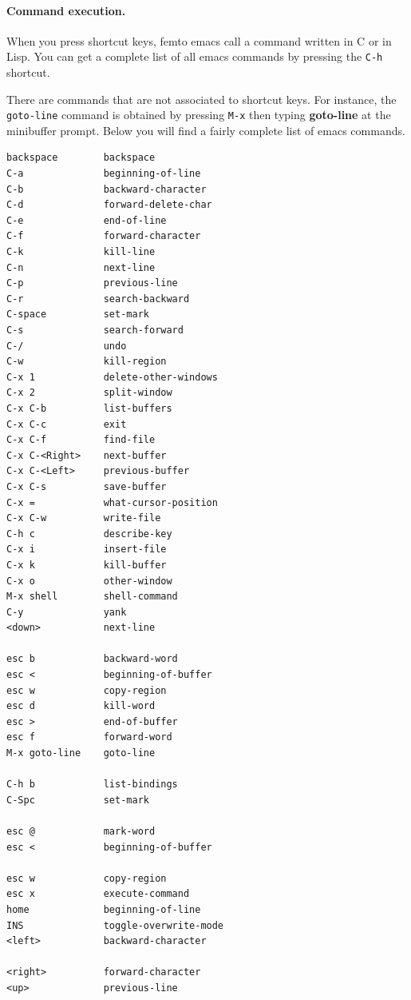 \documentclass[a4paper,12pt]{book}
\begin{document}
\paragraph{Command execution.} When you press 
shortcut keys, femto emacs call a command written in
C or in Lisp. You can get a complete list of all
emacs commands by pressing the 
\verb|C-h| shortcut.

There are commands that are not associated to
 shortcut keys. 
For instance, the \verb|goto-line| command
is obtained by pressing \verb|M-x| then typing
{\bf goto-line} at the minibuffer prompt.
Below you will find a fairly complete list
of emacs commands.

\begin{verbatim}
backspace        backspace
C-a              beginning-of-line
C-b              backward-character
C-d              forward-delete-char
C-e              end-of-line
C-f              forward-character
C-k              kill-line
C-n              next-line
C-p              previous-line
C-r              search-backward
C-space          set-mark
C-s              search-forward
C-/              undo
C-w              kill-region
C-x 1            delete-other-windows
C-x 2            split-window
C-x C-b          list-buffers
C-x C-c          exit
C-x C-f          find-file
C-x C-<Right>    next-buffer
C-x C-<Left>     previous-buffer
C-x C-s          save-buffer
C-x =            what-cursor-position
C-x C-w          write-file
C-h c            describe-key
C-x i            insert-file
C-x k            kill-buffer
C-x o            other-window
M-x shell        shell-command
C-y              yank
<down>           next-line

esc b            backward-word
esc <            beginning-of-buffer
esc w            copy-region
esc d            kill-word
esc >            end-of-buffer
esc f            forward-word
M-x goto-line    goto-line

C-h b            list-bindings
C-Spc            set-mark
        
esc @            mark-word
esc <            beginning-of-buffer

esc w            copy-region
esc x            execute-command
home             beginning-of-line
INS              toggle-overwrite-mode
<left>           backward-character

<right>          forward-character
<up>             previous-line
\end{verbatim}
\end{document}
